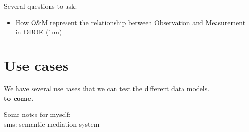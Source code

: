 \documentclass{article}
\begin{document}
Several questions to ask:
\begin{itemize}
\item How O\&M represent the relationship between Observation and Measurement in OBOE (1:m)
\end{itemize}

 
\section{Use cases}
We have several use cases that we can test the different data models. \\
{\bf to come. }

Some notes for myself: \\
sms: semantic mediation system



\end{document}
